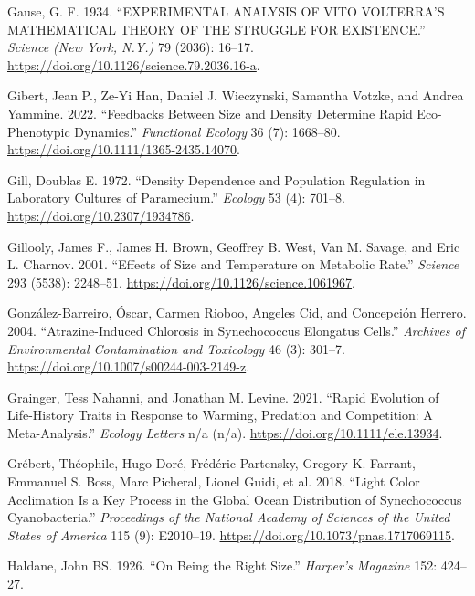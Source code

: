 \documentclass[
  letterpaper,
  DIV=11,
  numbers=noendperiod]{scrartcl}
\newlength{\cslhangindent}
\newenvironment{CSLReferences}[2] %
 {\begin{list}{}{%
  \setlength{\itemindent}{0pt}
  \setlength{\leftmargin}{0pt}
  \setlength{\parsep}{0pt}
  \ifodd #1
   \setlength{\leftmargin}{\cslhangindent}
   \setlength{\itemindent}{-1\cslhangindent}
  \fi
  \setlength{\itemsep}{#2\baselineskip}}}
 {\end{list}}
\begin{document}
\begin{CSLReferences}{1}{0}
Gause, G. F. 1934. {``{EXPERIMENTAL ANALYSIS OF VITO VOLTERRA}'{S
MATHEMATICAL THEORY OF THE STRUGGLE FOR EXISTENCE}.''} \emph{Science
(New York, N.Y.)} 79 (2036): 16--17.
\url{https://doi.org/10.1126/science.79.2036.16-a}.

Gibert, Jean P., Ze-Yi Han, Daniel J. Wieczynski, Samantha Votzke, and
Andrea Yammine. 2022. {``Feedbacks Between Size and Density Determine
Rapid Eco-Phenotypic Dynamics.''} \emph{Functional Ecology} 36 (7):
1668--80. \url{https://doi.org/10.1111/1365-2435.14070}.

Gill, Doublas E. 1972. {``Density {Dependence} and {Population
Regulation} in {Laboratory Cultures} of {Paramecium}.''} \emph{Ecology}
53 (4): 701--8. \url{https://doi.org/10.2307/1934786}.

Gillooly, James F., James H. Brown, Geoffrey B. West, Van M. Savage, and
Eric L. Charnov. 2001. {``Effects of {Size} and {Temperature} on
{Metabolic Rate}.''} \emph{Science} 293 (5538): 2248--51.
\url{https://doi.org/10.1126/science.1061967}.

González-Barreiro, Óscar, Carmen Rioboo, Angeles Cid, and Concepción
Herrero. 2004. {``Atrazine-{Induced Chlorosis} in {Synechococcus}
Elongatus {Cells}.''} \emph{Archives of Environmental Contamination and
Toxicology} 46 (3): 301--7.
\url{https://doi.org/10.1007/s00244-003-2149-z}.

Grainger, Tess Nahanni, and Jonathan M. Levine. 2021. {``Rapid Evolution
of Life-History Traits in Response to Warming, Predation and
Competition: {A} Meta-Analysis.''} \emph{Ecology Letters} n/a (n/a).
\url{https://doi.org/10.1111/ele.13934}.

Grébert, Théophile, Hugo Doré, Frédéric Partensky, Gregory K. Farrant,
Emmanuel S. Boss, Marc Picheral, Lionel Guidi, et al. 2018. {``Light
Color Acclimation Is a Key Process in the Global Ocean Distribution of
{Synechococcus} Cyanobacteria.''} \emph{Proceedings of the National
Academy of Sciences of the United States of America} 115 (9): E2010--19.
\url{https://doi.org/10.1073/pnas.1717069115}.

Haldane, John BS. 1926. {``On Being the Right Size.''} \emph{Harper's
Magazine} 152: 424--27.


\end{CSLReferences}
\end{document}
